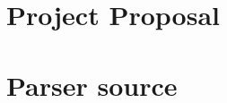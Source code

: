 \documentclass[12pt,twoside,notitlepage]{report}
\begin{document}

\cleardoublepage

\appendix












\cleardoublepage

\chapter{Project Proposal}

%

\clearpage

\chapter{Parser source}


\scriptsize
\end{document}
